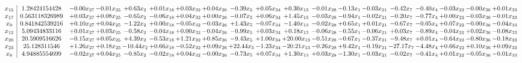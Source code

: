 \documentclass[9pt]{article}
\begin{document}
 \[\begin{array}{c| c c@{\hskip 2pt} c@{\hskip 2pt} c@{\hskip 2pt} c@{\hskip 2pt} c@{\hskip 2pt} c@{\hskip 2pt} c@{\hskip 2pt} c@{\hskip 2pt} c@{\hskip 2pt} c@{\hskip 2pt} c@{\hskip 2pt} c@{\hskip 2pt} c@{\hskip 2pt} c@{\hskip 2pt} c@{\hskip 2pt} c@{\hskip 2pt} c@{\hskip 2pt} }
 x_{15}   &  1.28424154428 & -0.00 x_{27} & -0.01 x_{25} & +  0.63 x_{2} & +  0.01 x_{18} & +  0.03 x_{32} & +  0.04 x_{26} & -0.39 x_{5} & +  0.05 x_{34} & +  0.30 x_{13} & -0.01 x_{28} & -0.13 x_{1} & -0.03 x_{21} & -0.42 x_{7} & -0.40 x_{4} & -0.03 x_{22} & -0.00 x_{36} & +  0.01 x_{33}\\
 x_{17}   &  0.563118326989 & +  0.03 x_{27} & +  0.08 x_{25} & -0.65 x_{2} & -0.06 x_{18} & +  0.04 x_{32} & +  0.00 x_{26} & -0.07 x_{5} & +  0.06 x_{34} & +  1.45 x_{13} & -0.03 x_{28} & -0.94 x_{1} & -0.02 x_{21} & -0.20 x_{7} & -0.77 x_{4} & +  0.00 x_{22} & -0.03 x_{36} & -0.01 x_{33}\\
 x_{9}   &  0.841842539216 & +  0.10 x_{27} & +  0.04 x_{25} & -1.22 x_{2} & +  0.00 x_{18} & -0.05 x_{32} & -0.03 x_{26} & +  1.43 x_{5} & -0.07 x_{34} & -1.40 x_{13} & -0.02 x_{28} & +  0.65 x_{1} & +  0.01 x_{21} & -0.67 x_{7} & -0.05 x_{4} & +  0.07 x_{22} & -0.00 x_{36} & -0.04 x_{33}\\
 x_{12}   &  5.09434833116 & +  0.01 x_{27} & +  0.03 x_{25} & -0.58 x_{2} & -0.04 x_{18} & +  0.00 x_{32} & -0.04 x_{26} & -0.99 x_{5} & +  0.03 x_{34} & +  0.18 x_{13} & -0.06 x_{28} & -0.55 x_{1} & -0.06 x_{21} & +  0.03 x_{7} & -0.89 x_{4} & -0.04 x_{22} & +  0.02 x_{36} & -0.08 x_{33}\\
 x_{20}   &  20.5909516626 & -0.15 x_{27} & +  0.05 x_{25} & +  4.39 x_{2} & -0.53 x_{18} & +  1.21 x_{32} & +  0.85 x_{26} & -9.43 x_{5} & +  1.00 x_{34} & + 20.00 x_{13} & -0.51 x_{28} & -0.67 x_{1} & -0.37 x_{21} & -9.48 x_{7} & +  0.01 x_{4} & -0.64 x_{22} & -0.80 x_{36} & -0.18 x_{33}\\
 x_{23}   &  25.128311546 & +  1.26 x_{27} & +  0.18 x_{25} & -10.44 x_{2} & +  0.66 x_{18} & -0.52 x_{32} & +  0.09 x_{26} & + 22.44 x_{5} & -1.23 x_{34} & -20.21 x_{13} & -0.26 x_{28} & +  9.42 x_{1} & -0.19 x_{21} & -27.17 x_{7} & -4.48 x_{4} & +  0.66 x_{22} & +  0.10 x_{36} & +  0.09 x_{33}\\
 x_{8}   &  4.94885554699 & -0.02 x_{27} & +  0.04 x_{25} & -0.85 x_{2} & -0.02 x_{18} & +  0.04 x_{32} & -0.00 x_{26} & -0.73 x_{5} & +  0.07 x_{34} & +  1.30 x_{13} & +  0.03 x_{28} & -1.30 x_{1} & -0.03 x_{21} & -0.02 x_{7} & -0.41 x_{4} & +  0.01 x_{22} & -0.05 x_{36} & -0.01 x_{33}\\

\end{array}\]
\end{document}
